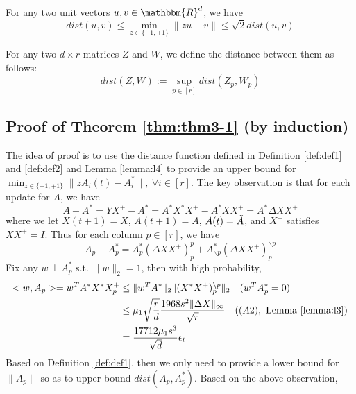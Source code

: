 \begin{lemma}
For any two unit vectors $u,v\in\mathbbm{R}^d$, we have
\begin{equation*}
dist(u,v)\leq \min_{z\in \{-1,+1\}} \lVert zu-v \rVert \leq \sqrt{2}dist(u,v)
\end{equation*}
\label{lemma:l4}
\end{lemma}
\begin{definition}
For any two $d\times r$ matrices $Z$ and $W$, we define the distance between them as follows:
\begin{equation*}
dist(Z,W):=\sup_{p\in[r]} dist(Z_p,W_p)
\end{equation*}
\label{def:def2}
\end{definition}
\subsection{Proof of Theorem \ref{thm:thm3-1} (by induction)}
The idea of proof is to use the distance function defined in Definition \ref{def:def1} and \ref{def:def2} and Lemma \ref{lemma:l4} to provide an upper bound for $\min_{z\in \{-1,+1\}}\lVert zA_i(t)-A_i^*\rVert,~\forall i \in [r]$.
The key observation is that for each update for $A$, we have
\begin{equation*}
    A-A^*=YX^+-A^*=A^*X^*X^+-A^*XX^+=A^*\Delta XX^+
\end{equation*}
where we let $X(t+1)=X$, $A(t+1)=A$, $A(t)=\Tilde{A}$, and $X^+$ satisfies $XX^+=I$.
Thus for each column $p\in[r]$, we have
\begin{equation*}
    A_p-A_p^*=A_p^*(\Delta XX^+)_p^p+A_{\backslash p}^*(\Delta XX^+)_p^{\backslash p}
\end{equation*}
Fix any $w\perp A_p^*$ s.t. $\lVert w\rVert_2=1$, then with high probability,
\begin{align*}
    <w,A_p>=w^TA^*X^*X^+_p &\leq \lVert w^TA^*\rVert_2 \lVert (X^*X^+)_p^{\backslash p}\rVert_2~~~(w^TA^*_p=0)\\
    &\leq \mu_1\sqrt{\frac{r}{d}}\frac{1968s^2\lVert \Delta X \rVert_{\infty}}{\sqrt{r}}~~~((A2),~\text{Lemma \ref{lemma:l3})}\\
    &=\frac{17712\mu_1s^3}{\sqrt{d}}\epsilon_t
\end{align*}
Based on Definition \ref{def:def1}, then we only need to provide a lower bound for $\lVert A_p \rVert$ so as to upper bound $dist(A_p,A_p^*)$. Based on the above observation,
